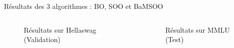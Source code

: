 \begin{frame}{Résultats des 3 algorithmes : BO, SOO et BaMSOO}
    \begin{columns}

        \begin{column}{0.45\textwidth}
            \begin{figure}
                \centering
                
                \caption{Résultats sur Hellaswag (Validation)}
            \end{figure}
        \end{column}
        \begin{column}{0.45\textwidth}
            \begin{figure}
                \centering
                
                \caption{Résultats sur MMLU (Test)}
            \end{figure}
        \end{column}
    \end{columns}
\end{frame}

